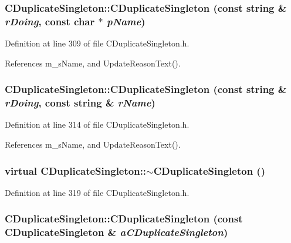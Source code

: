 \subsubsection{\setlength{\rightskip}{0pt plus 5cm}CDuplicate\-Singleton::CDuplicate\-Singleton (const string \& {\em r\-Doing}, const char $\ast$ {\em p\-Name})\hspace{0.3cm}{\tt  [inline]}}\label{classCDuplicateSingleton_a2}




Definition at line 309 of file CDuplicate\-Singleton.h.

References m\_\-s\-Name, and Update\-Reason\-Text().
\subsubsection{\setlength{\rightskip}{0pt plus 5cm}CDuplicate\-Singleton::CDuplicate\-Singleton (const string \& {\em r\-Doing}, const string \& {\em r\-Name})\hspace{0.3cm}{\tt  [inline]}}\label{classCDuplicateSingleton_a3}




Definition at line 314 of file CDuplicate\-Singleton.h.

References m\_\-s\-Name, and Update\-Reason\-Text().
\subsubsection{\setlength{\rightskip}{0pt plus 5cm}virtual CDuplicate\-Singleton::$\sim$CDuplicate\-Singleton ()\hspace{0.3cm}{\tt  [inline, virtual]}}\label{classCDuplicateSingleton_a4}




Definition at line 319 of file CDuplicate\-Singleton.h.
\subsubsection{\setlength{\rightskip}{0pt plus 5cm}CDuplicate\-Singleton::CDuplicate\-Singleton (const CDuplicate\-Singleton \& {\em a\-CDuplicate\-Singleton})\hspace{0.3cm}{\tt  [inline]}}\label{classCDuplicateSingleton_a5}





